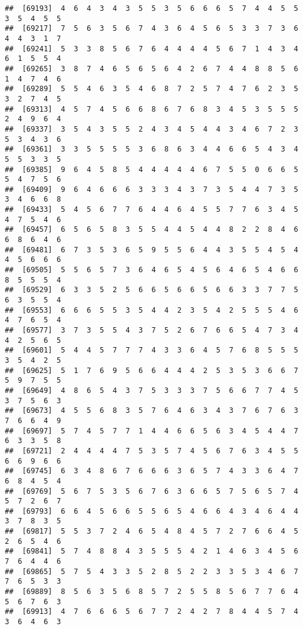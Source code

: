 \documentclass[
]{book}
\begin{document}
\begin{verbatim}
##  [69193]  4  6  4  3  4  3  5  5  3  5  6  6  6  5  7  4  4  5  5  3  5  4  5  5
##  [69217]  7  5  6  3  5  6  7  4  3  6  4  5  6  5  3  3  7  3  6  4  4  3  1  7
##  [69241]  5  3  3  8  5  6  7  6  4  4  4  4  5  6  7  1  4  3  4  6  1  5  5  4
##  [69265]  3  8  7  4  6  5  6  5  6  4  2  6  7  4  4  8  8  5  6  1  4  7  4  6
##  [69289]  5  5  4  6  3  5  4  6  8  7  2  5  7  4  7  6  2  3  5  3  2  7  4  5
##  [69313]  4  5  7  4  5  6  6  8  6  7  6  8  3  4  5  3  5  5  5  2  4  9  6  4
##  [69337]  3  5  4  3  5  5  2  4  3  4  5  4  4  3  4  6  7  2  3  5  3  4  3  6
##  [69361]  3  3  5  5  5  5  3  6  8  6  3  4  4  6  6  5  4  3  4  5  5  3  3  5
##  [69385]  9  6  4  5  8  5  4  4  4  4  4  6  7  5  5  0  6  6  5  5  4  7  5  6
##  [69409]  9  6  4  6  6  6  3  3  3  4  3  7  3  5  4  4  7  3  5  3  4  6  6  8
##  [69433]  5  4  5  6  7  7  6  4  4  6  4  5  5  7  7  6  3  4  5  4  7  5  4  6
##  [69457]  6  5  6  5  8  3  5  5  4  4  5  4  4  8  2  2  8  4  6  6  8  6  4  6
##  [69481]  6  7  3  5  3  6  5  9  5  5  6  4  4  3  5  5  4  5  4  4  5  6  6  6
##  [69505]  5  5  6  5  7  3  6  4  6  5  4  5  6  4  6  5  4  6  6  8  5  5  5  4
##  [69529]  6  3  3  5  2  5  6  6  5  6  6  5  6  6  3  3  7  7  5  6  3  5  5  4
##  [69553]  6  6  6  5  5  3  5  4  4  2  3  5  4  2  5  5  5  4  6  4  7  6  5  4
##  [69577]  3  7  3  5  5  4  3  7  5  2  6  7  6  6  5  4  7  3  4  4  2  5  6  5
##  [69601]  5  4  4  5  7  7  7  4  3  3  6  4  5  7  6  8  5  5  5  3  5  4  2  5
##  [69625]  5  1  7  6  9  5  6  6  4  4  4  2  5  3  5  3  6  6  7  5  9  7  5  5
##  [69649]  4  8  6  5  4  3  7  5  3  3  3  7  5  6  6  7  7  4  5  3  7  5  6  3
##  [69673]  4  5  5  6  8  3  5  7  6  4  6  3  4  3  7  6  7  6  3  7  6  6  4  9
##  [69697]  5  7  4  5  7  7  1  4  4  6  6  5  6  3  4  5  4  4  7  6  3  3  5  8
##  [69721]  2  4  4  4  4  7  5  3  5  7  4  5  6  7  6  3  4  5  5  6  6  9  6  6
##  [69745]  6  3  4  8  6  7  6  6  6  3  6  5  7  4  3  3  6  4  7  6  8  4  5  4
##  [69769]  5  6  7  5  3  5  6  7  6  3  6  6  5  7  5  6  5  7  4  5  7  2  6  7
##  [69793]  6  6  4  5  6  6  5  5  6  5  4  6  6  4  3  4  6  4  4  3  7  8  3  5
##  [69817]  5  5  3  7  2  4  6  5  4  8  4  5  7  2  7  6  6  4  5  2  6  5  4  6
##  [69841]  5  7  4  8  8  4  3  5  5  5  4  2  1  4  6  3  4  5  6  7  6  4  4  6
##  [69865]  5  7  5  4  3  3  5  2  8  5  2  2  3  3  5  3  4  6  7  7  6  5  3  3
##  [69889]  8  5  6  3  5  6  8  5  7  2  5  5  8  5  6  7  7  6  4  5  6  7  6  3
##  [69913]  4  7  6  6  6  5  6  7  7  2  4  2  7  8  4  4  5  7  4  3  6  4  6  3

\end{verbatim}
\end{document}
